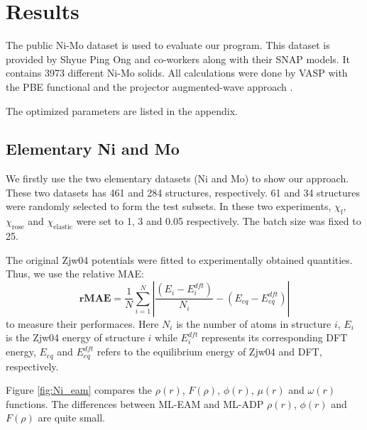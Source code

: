 \documentclass[prb,reprint,superscriptaddress]{revtex4-2}
\begin{document}
% 
%
\section{Results}
\label{sec:results}

The public Ni-Mo dataset \cite{SNAP} is used to evaluate our program. This 
dataset is provided by Shyue Ping Ong and co-workers along with their SNAP 
models. It contains 3973 different Ni-Mo solids. All calculations were done by 
VASP \cite{VASP} with the PBE \cite{PBE} functional and the projector 
augmented-wave approach \cite{PAW}. 

The optimized parameters are listed in the appendix.

% 
%
\subsection{Elementary Ni and Mo}
\label{sec:elementary}

We firstly use the two elementary datasets (Ni and Mo) to show our approach. These 
two datasets has 461 and 284 structures, respectively. 61 and 34 structures were 
randomly selected to form the test subsets. In these two experiments, 
$\chi_{\mathrm{f}}$, $\chi_{\mathrm{rose}}$ and $\chi_{\mathrm{elastic}}$ were 
set to 1, 3 and 0.05 respectively. The batch size was fixed to 25.

The original Zjw04 potentials were fitted to experimentally obtained quantities.
Thus, we use the relative MAE:
\begin{equation}
\mathbf{rMAE} = \frac{1}{N}\sum_{i=1}^{N}{
    | \frac{(E_i - E_i^{dft})}{N_i} - (E_{eq} - E_{eq}^{dft}) |
}
\end{equation}
to measure their performaces. Here $N_i$ is the number of atoms in structure 
$i$, $E_i$ is the Zjw04 energy of structure $i$ while $E_i^{dft}$ represents its 
corresponding DFT energy, $E_{eq}$ and $E_{eq}^{dft}$ refers to the equilibrium 
energy of Zjw04 and DFT, respectively.

Figure \ref{fig:Ni_eam} compares the $\rho(r)$, $F(\rho)$, $\phi(r)$, 
$\mu(r)$ and $\omega(r)$ functions. The differences between ML-EAM and ML-ADP 
$\rho(r)$, $\phi(r)$ and $F(\rho)$ are quite small. 
\end{document}
